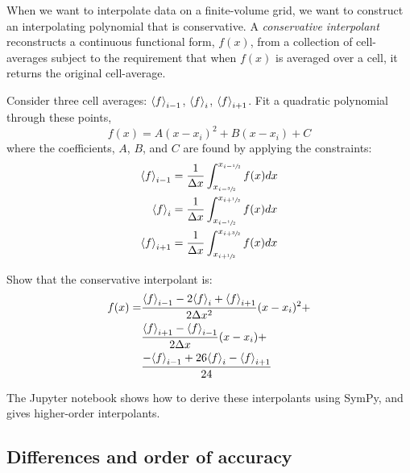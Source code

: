 When we want to interpolate data on a finite-volume grid, we want to
construct an interpolating polynomial that is conservative.  A {\em
  conservative interpolant} reconstructs a continuous functional form,
$f(x)$, from a collection of cell-averages subject to the requirement
that when $f(x)$ is averaged over a cell, it returns the original
cell-average.

\begin{exercise}
{\label{ex:consinterp} 

Consider three cell averages: ${\langle f\rangle}_{i-1}$, ${\langle f\rangle}_{i}$, ${\langle f\rangle}_{i+1}$.  Fit a quadratic polynomial through these points,
 \begin{equation}
 f(x) = A (x - x_i)^2 + B (x - x_i) + C
 \end{equation}
 where the coefficients, $A$, $B$, and $C$ are found by applying the constraints:
 \begin{align}
 {\langle f\rangle}_{i-1} &= \frac{1}{\Delta x}
      \int_{x_{i-\sfrac{3}{2}}}^{x_{i-{\sfrac{1}{2}}}} f(x) dx \\
 {\langle f\rangle}_{i} &= \frac{1}{\Delta x}
      \int_{x_{i-{\sfrac{1}{2}}}}^{x_{i+{\sfrac{1}{2}}}} f(x) dx \\
 {\langle f\rangle}_{i+1} &= \frac{1}{\Delta x}
      \int_{x_{i+{\sfrac{1}{2}}}}^{x_{i+\sfrac{3}{2}}} f(x) dx
 \end{align}

Show that the conservative interpolant is:
\begin{align}
f(x) = &\frac{{\langle f\rangle}_{i-1} - 2 {\langle f\rangle}_i +
             {\langle f\rangle}_{i+1}}{2\Delta x^2} (x-x_i)^2 + \nonumber \\
       &\frac{{\langle f\rangle}_{i+1} - {\langle f\rangle}_{i-1}}
            {2\Delta x} (x-x_i) + \nonumber \\
       &\frac{-{\langle f\rangle}_{i-1} + 26 {\langle f\rangle}_i
             -{\langle f\rangle}_{i+1}}{24}
\end{align}
}
\end{exercise}

The {\sf Jupyter} notebook
shows how to derive these interpolants using {\sf SymPy}, and gives
higher-order interpolants.


\subsection{Differences and order of accuracy}

